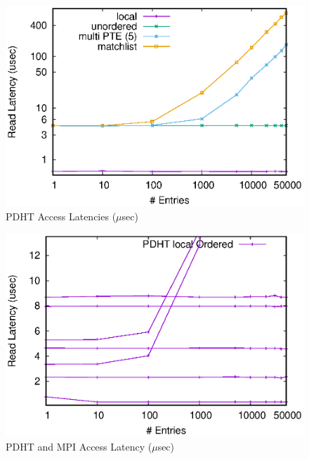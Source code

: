 \begin{figure}[ht]
  \center
  \includegraphics[width=.95\linewidth]{plots/pdhtlatency}
  \caption{PDHT Access Latencies ($\mu$sec)}
  \label{fig:6}
\end{figure}

\begin{figure}[ht]
  \center
  \includegraphics[width=.95\linewidth]{plots/mpilatency}
  \caption{PDHT and MPI Access Latency ($\mu$sec)}
  \label{fig:7}
\end{figure}

